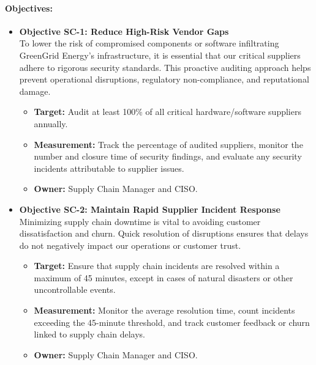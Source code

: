 \paragraph{Objectives:}
\begin{itemize}
      \item \textbf{Objective SC-1: Reduce High-Risk Vendor Gaps} \\
            To lower the risk of compromised components or software infiltrating GreenGrid Energy's infrastructure, it is essential that our critical suppliers adhere to rigorous security standards. This proactive auditing approach helps prevent operational disruptions, regulatory non-compliance, and reputational damage.
            \begin{itemize}
                  \item \textbf{Target:} Audit at least 100\% of all critical hardware/software suppliers annually.
                  \item \textbf{Measurement:} Track the percentage of audited suppliers, monitor the number and closure time of security findings, and evaluate any security incidents attributable to supplier issues.
                  \item \textbf{Owner:} Supply Chain Manager and \ac{CISO}.
            \end{itemize}

      \item \textbf{Objective SC-2: Maintain Rapid Supplier Incident Response} \\
            Minimizing supply chain downtime is vital to avoiding customer dissatisfaction and churn. Quick resolution of disruptions ensures that delays do not negatively impact our operations or customer trust.
            \begin{itemize}
                  \item \textbf{Target:} Ensure that supply chain incidents are resolved within a maximum of 45 minutes, except in cases of natural disasters or other uncontrollable events.
                  \item \textbf{Measurement:} Monitor the average resolution time, count incidents exceeding the 45-minute threshold, and track customer feedback or churn linked to supply chain delays.
                  \item \textbf{Owner:} Supply Chain Manager and \ac{CISO}.
            \end{itemize}
\end{itemize}


